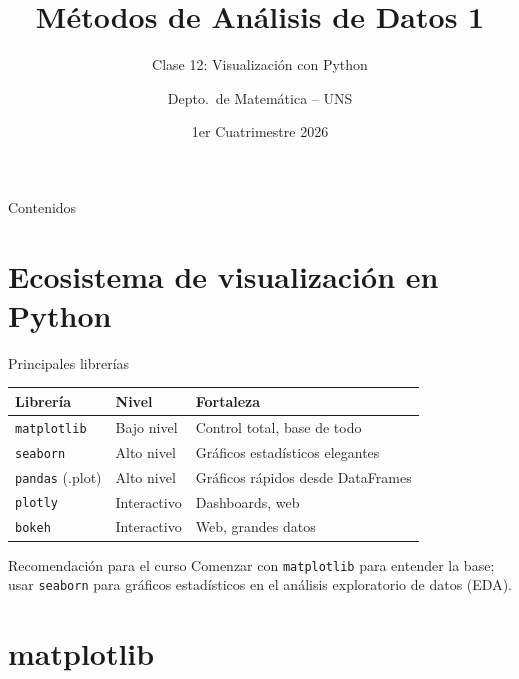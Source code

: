 \documentclass[aspectratio=169]{beamer}
\title{Métodos de Análisis de Datos 1}
\subtitle{Clase 12: Visualización con Python}
\author{Depto.\ de Matemática -- UNS}
\institute{Universidad Nacional del Sur}
\date{1er Cuatrimestre 2026}
\begin{document}
\begin{frame}
  \titlepage
\end{frame}

\begin{frame}{Contenidos}
  \tableofcontents
\end{frame}

\section{Ecosistema de visualización en Python}

\begin{frame}{Principales librerías}
  \begin{center}
    \begin{tabular}{lll}
      \toprule
      \textbf{Librería} & \textbf{Nivel} & \textbf{Fortaleza} \\
      \midrule
      \texttt{matplotlib} & Bajo nivel & Control total, base de todo \\
      \texttt{seaborn} & Alto nivel & Gráficos estadísticos elegantes \\
      \texttt{pandas} (.plot) & Alto nivel & Gráficos rápidos desde DataFrames \\
      \texttt{plotly} & Interactivo & Dashboards, web \\
      \texttt{bokeh} & Interactivo & Web, grandes datos \\
      \bottomrule
    \end{tabular}
  \end{center}
  \bigskip
  \begin{block}{Recomendación para el curso}
    Comenzar con \texttt{matplotlib} para entender la base; usar \texttt{seaborn} para gráficos estadísticos en el análisis exploratorio de datos (EDA).
  \end{block}
\end{frame}

\section{matplotlib}
\end{document}

